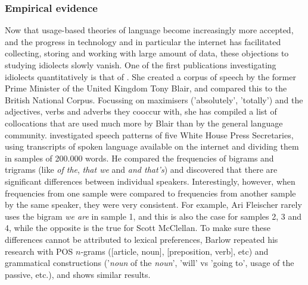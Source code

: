 \documentclass[12pt]{article}
\begin{document}
\subsubsection{Empirical evidence}
Now that usage-based theories of language become increasingly more accepted, and the progress in technology and in particular the internet has facilitated collecting, storing and working with large amount of data, these objections to studying idiolects slowly vanish. One of the first publications investigating idiolects quantitatively is that of . She created a corpus of speech by the former Prime Minister of the United Kingdom Tony Blair, and compared this to the British National Corpus. Focussing on maximisers ('absolutely', 'totally') and the adjectives, verbs and adverbs they cooccur with, she has compiled a list of collocations that are used much more by Blair than by the general language community.  investigated speech patterns of five White House Press Secretaries, using transcripts of spoken language available on the internet and dividing them in samples of 200.000 words. He compared the frequencies of bigrams and trigrams (like \emph{of the}, \emph{that we} and \emph{and that's}) and discovered that there are significant differences between individual speakers. Interestingly, however, when frequencies from one sample were compared to frequencies from another sample by the same speaker, they were very consistent. For example, Ari Fleischer rarely uses the bigram \emph{we are} in sample 1, and this is also the case for samples 2, 3 and 4, while the opposite is the true for Scott McClellan. To make sure these differences cannot be attributed to lexical preferences, Barlow repeated his research with POS $n$-grams ([article, noun], [preposition, verb], etc) and grammatical constructions ('\emph{noun} of the \emph{noun}',  'will' vs 'going to', usage of the passive, etc.), and shows similar results.
\end{document}
